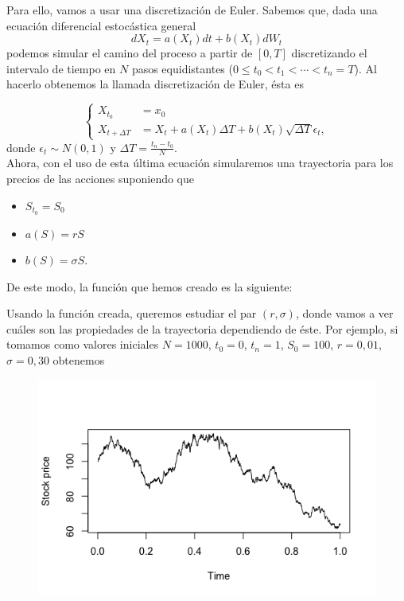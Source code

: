 \documentclass[a4paper,]{article}
\begin{document}
Para ello, vamos a usar una discretización de Euler. Sabemos que, dada una ecuación diferencial estocástica general
$$dX_t=a(X_t)dt+b(X_t)dW_t$$
podemos simular el camino del proceso a partir de $[0,T]$ discretizando el intervalo de tiempo en $N$ pasos equidistantes ($0\leq t_0<t_1<\dotsb<t_n=T$). Al hacerlo obtenemos la llamada discretización de Euler, ésta es

\begin{equation*}
  \begin{cases}
    X_{t_0}&= x_0 \\
    X_{t+\Delta T} &= X_t+a(X_t)\Delta T+b(X_t)\sqrt{\Delta T}\epsilon_t,
\end{cases}  
\end{equation*}
donde $\epsilon_t\sim N(0,1)$ y $\Delta T=\frac{t_n-t_0}{N}.$ \\

Ahora, con el uso de esta última ecuación simularemos una trayectoria para los precios de las acciones suponiendo que
\begin{itemize}
    \item $S_{t_0}=S_0$
    \item $a(S)=rS$
    \item $b(S)=\sigma S.$
\end{itemize}

De este modo, la función que hemos creado es la siguiente:
\vspace{1cm}

Usando la función creada, queremos estudiar el par $(r, \sigma)$, donde vamos a ver cuáles son las propiedades de la trayectoria dependiendo de éste. Por ejemplo, si tomamos como valores iniciales $N=1000$, $t_0=0$, $t_n=1$, $S_0=100$, $r=0,01$, $\sigma=0,30$ obtenemos
\begin{figure}[H]
    \centering
    \includegraphics[width=0.6\linewidth]{plot4.png}
\end{figure}
\end{document}
